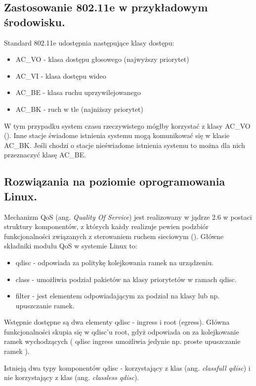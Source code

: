 \subsection{Zastosowanie 802.11e w przykładowym środowisku.}

Standard 802.11e udostępnia następujące klasy dostępu:

\begin{itemize}
\item AC\_VO - klasa dostępu głosowego (najwyższy priorytet)
\item AC\_VI - klasa dostępu wideo
\item AC\_BE - klasa ruchu uprzywilejowanego 
\item AC\_BK - ruch w tle (najniższy priorytet)
\end{itemize}

W tym przypadku system czasu rzeczywistego mógłby korzystać z klasy AC\_VO (\cite{pub:802.11e}). Inne stacje świadome istnienia systemu mogą komunikować się w klasie AC\_BK. Jeśli chodzi o stacje nieświadome istnienia systemu to można dla nich przeznaczyć klasę AC\_BE.

\subsection{Rozwiązania na poziomie oprogramowania Linux.}

Mechanizm QoS (ang. \emph{Quality Of Service}) jest realizowany w jądrze 2.6 w postaci struktury komponentów, z których każdy realizuje pewien podzbiór funkcjonalności związanych z sterowaniem ruchem sieciowym (\cite{pub:QoS}). Główne składniki modułu QoS w systemie Linux to:

\begin{itemize}
\item qdisc - odpowiada za politykę kolejkowania ramek na urządzeniu.
\item class - umożliwia podział pakietów na klasy priorytetów w ramach qdisc.
\item filter - jest elementem odpowiadającym za podział na klasy lub np. upuszczanie ramek.
\end{itemize}

Wstępnie dostępne są dwa elementy qdisc - ingress i root (egress). Główna funkcjonalności skupia się w qdisc'u root, gdyż odpowiada on za kolejkowanie ramek wychodzących ( qdisc ingress umożliwia jedynie np. proste upuszczanie ramek ).

Istnieją dwa typy komponentów qdisc - korzystający z klas (ang. \emph{classfull qdisc}) i nie korzystający z klas (ang. \emph{classless qdisc}). 

